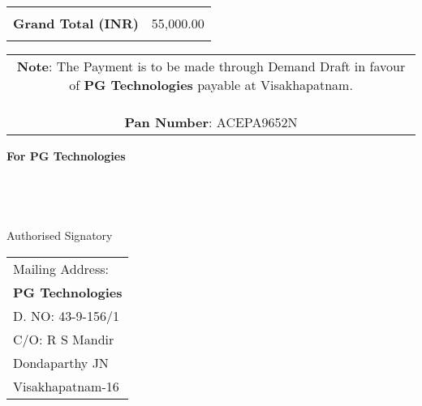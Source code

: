 \documentclass[11pt,a4]{article}
\begin{document}

\hspace*{12.4cm}
\begin{tabular}{|c|r|}
\hline
& \\
{\bf Grand Total (INR)} & 55,000.00 \\
& \\
\hline
\end{tabular}

\vspace*{-1.25cm}
\noindent \begin{tabular}{c}
\parbox{4in}{ {\bf Note}: The Payment is to be made through Demand Draft in favour of {\bf PG Technologies} payable at Visakhapatnam. \\ \\
{\noindent \bf Pan Number}:  ACEPA9652N }\\
\end{tabular}
\vspace*{85pt}


{\bf For  PG Technologies } \\ \\ \\ \\ \\
 \hspace*{0.6cm}Authorised Signatory
\vspace*{-72pt}
\begin{flushright}
\begin{tabular}{l}
Mailing Address:\\
{\bf PG Technologies}\\
D. NO: 43-9-156/1\\
C/O: R S Mandir\\
Dondaparthy JN\\ 
Visakhapatnam-16\\
\end{tabular}
\end{flushright}
\end{document}
